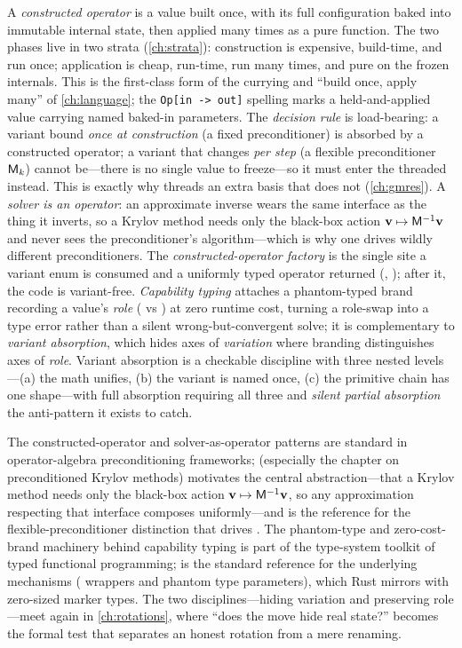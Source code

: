 \summarysection
A \emph{constructed operator} is a value built once, with its full configuration baked
into immutable internal state, then applied many times as a pure function. The two
phases live in two strata (\cref{ch:strata}): construction is expensive, build-time,
and run once; application is cheap, run-time, run many times, and pure on the frozen
internals. This is the first-class form of the currying and ``build once, apply many''
of \cref{ch:language}; the \lstinline[style=l4style]|Op[in -> out]| spelling marks a
held-and-applied value carrying named baked-in parameters. The \emph{decision rule} is
load-bearing: a variant bound \emph{once at construction} (a fixed preconditioner) is
absorbed by a constructed operator; a variant that changes \emph{per step} (a flexible
preconditioner $\mathsf{M}_k$) cannot be---there is no single value to freeze---so it must
enter the threaded  instead. This is exactly why  threads
an extra basis  that  does not (\cref{ch:gmres}). A \emph{solver is
an operator}: an approximate inverse wears the same  interface as the thing
it inverts, so a Krylov method needs only the black-box action $\mathbf{v} \mapsto
\mathsf{M}^{-1}\mathbf{v}$ and never sees the preconditioner's algorithm---which is why one
 drives wildly different preconditioners. The
\emph{constructed-operator factory} is the single site a variant enum is consumed and a
uniformly typed operator returned (,
); after it, the code is variant-free.
\emph{Capability typing} attaches a phantom-typed brand recording a value's \emph{role}
( vs ) at zero runtime cost, turning a role-swap into a
type error rather than a silent wrong-but-convergent solve; it is complementary to
\emph{variant absorption}, which hides axes of \emph{variation} where branding
distinguishes axes of \emph{role}. Variant absorption is a checkable discipline with
three nested levels---(a) the math unifies, (b) the variant is named once, (c) the
primitive chain has one shape---with full absorption requiring all three and
\emph{silent partial absorption} the anti-pattern it exists to catch.

\furtherreading
The constructed-operator and solver-as-operator patterns are standard in operator-algebra
preconditioning frameworks; \citet{saad2003} (especially the chapter on preconditioned
Krylov methods) motivates the central abstraction---that a Krylov method needs only the
black-box action $\mathbf{v} \mapsto \mathsf{M}^{-1}\mathbf{v}$, so any approximation respecting that
interface composes uniformly---and is the reference for the flexible-preconditioner
distinction that drives . The phantom-type and zero-cost-brand machinery
behind capability typing is part of the type-system toolkit of typed functional
programming; \citet{peytonjones2003} is the standard reference for the underlying
mechanisms ( wrappers and phantom type parameters), which Rust mirrors
with zero-sized marker types. The two disciplines---hiding variation and preserving
role---meet again in \cref{ch:rotations}, where ``does the move hide real state?''
becomes the formal test that separates an honest rotation from a mere renaming.

